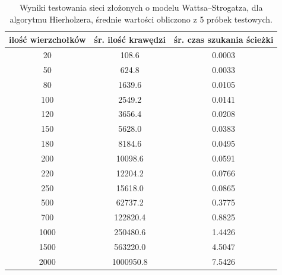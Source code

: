 \documentclass[a4paper, 12pt, twoside, openright]{article}
\begin{document}
\begin{table}[!p]
	\centering
	\caption{Wyniki testowania sieci złożonych o modelu Wattsa–Strogatza, dla algorytmu Hierholzera, średnie wartości obliczono z 5 próbek testowych.}
	\resizebox{16cm}{!}
	{
		\begin{tabular}{|c c c|}
			\hline
			ilość wierzchołków	& śr. ilość krawędzi 		& śr. czas szukania ścieżki\\ \hline \hline
			20 	& 108.6  		& 0.0003 	\\ \hline
			50 	& 624.8 		& 0.0033 	\\ \hline
			80 	& 1639.6        & 0.0105	\\ \hline
			100 & 2549.2        & 0.0141	\\ \hline
			120 & 3656.4        & 0.0208	\\ \hline
			150 & 5628.0   		& 0.0383	\\ \hline
			180 & 8184.6        & 0.0495	\\ \hline
			200 & 10098.6 		& 0.0591	\\ \hline
			220 & 12204.2 		& 0.0766	\\ \hline
			250 & 15618.0 		& 0.0865	\\ \hline
			500 & 62737.2 		& 0.3775	\\ \hline				
			700 & 122820.4      & 0.8825	\\ \hline
			1000& 250480.6	    & 1.4426 	\\ \hline
			1500& 563220.0	    & 4.5047	\\ \hline
			2000& 1000950.8    	& 7.5426	\\ \hline
		\end{tabular} 
	}
	\label{Tab:Hie_WS}
\end{table}
\end{document}
